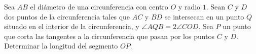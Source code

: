Sea $ AB$ el diámetro de una circunferencia con centro $ O$ y radio $ 1$. Sean $ C$ y $ D$ dos puntos de la circunferencia tales que $ AC$ y $ BD$ se intersecan en un punto $ Q$ situado en el interior de la circunferencia, y $ \angle AQB = 2 \angle COD$. Sea $ P$ un punto que corta las tangentes a la circunferencia que pasan por los puntos $ C$ y $ D$.
Determinar la longitud del segmento $ OP$.
